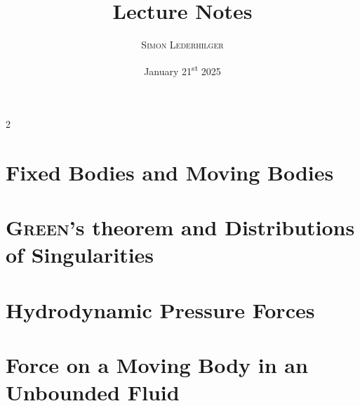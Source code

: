 \documentclass{article}
\title{Lecture Notes}
\subtitle{\textit{\headcourse}}
\author{\textsc{Simon Lederhilger}}
\date{January 21\textsuperscript{st} 2025}
\begin{document}
\maketitle\thispagestyle{fancy}
\begin{multicols*}{2}
\section[Bodies in Fluid]{Fixed Bodies and Moving Bodies}
\begingroup\endgroup

\section[Green's Theorem]{\textsc{Green}'s theorem and Distributions of Singularities}
\begingroup\endgroup

\section[Pressure Forces]{Hydrodynamic Pressure Forces}
\begingroup\endgroup

\section[Force on Geometry]{Force on a Moving Body in an Unbounded Fluid}
\begingroup\endgroup

\end{multicols*}
\end{document}
